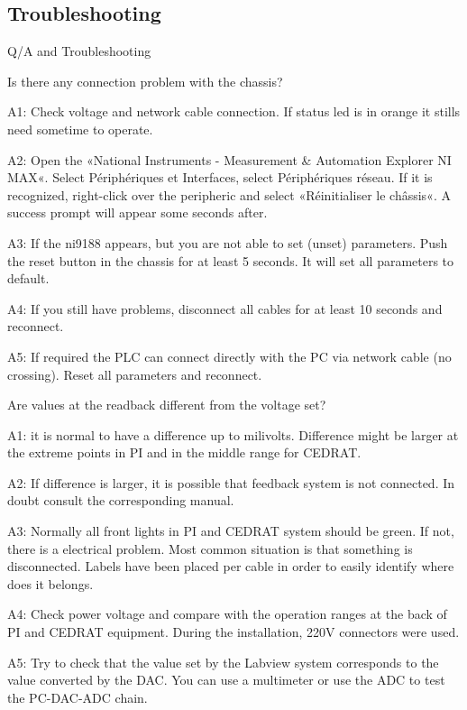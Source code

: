 \documentclass[a4paper,11pt]{book}
\begin{document}
\subsection{Troubleshooting}
Q/A and Troubleshooting\par 
Is there any connection problem with the chassis?\par 
A1: Check voltage and network cable connection. If status led is in orange it stills need sometime to operate.\par 
A2: Open the «National Instruments - Measurement \& Automation Explorer NI MAX«. Select Périphériques et Interfaces, select Périphériques réseau. If it is recognized, right-click over the peripheric and select «Réinitialiser le châssis«. A success prompt will appear some seconds after.\par 
A3: If the ni9188 appears, but you are not able to set (unset) parameters. Push the reset button in the chassis for at least 5 seconds. It will set all parameters to default.\par 
A4: If you still have problems, disconnect all cables for at least 10 seconds and reconnect.\par 
A5: If required the PLC can connect directly with the PC via network cable (no crossing). Reset all parameters and reconnect.\par 

Are values at the readback different from the voltage set?\par 
A1: it is normal to have a difference up to milivolts. Difference might be larger at the extreme points in PI and in the middle range for CEDRAT.\par 
A2: If difference is larger, it is possible that feedback system is not connected. In doubt  consult the corresponding manual.\par 
A3: Normally all front lights in PI and CEDRAT system should be green. If not, there is a electrical problem. Most common situation is that something is disconnected. Labels have been placed per cable in order to easily identify where does it belongs.\par 
A4: Check power voltage and compare with the operation ranges at the back of PI and CEDRAT equipment. During the installation, 220V connectors were used.\par 
A5: Try to check that the value set by the Labview system corresponds to the value converted by the DAC. You can use a multimeter or use the ADC to test the PC-DAC-ADC chain.\par 
\end{document}
